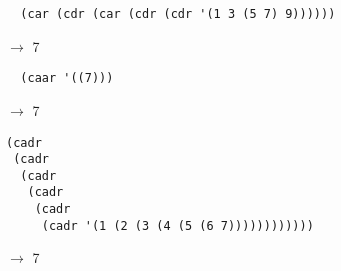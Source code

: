 \documentclass[a4paper,12pt]{article}
\begin{document}
\begin{lstlisting}
  (car (cdr (car (cdr (cdr '(1 3 (5 7) 9))))))
\end{lstlisting}
$\rightarrow$ 7
\begin{lstlisting}
  (caar '((7)))
\end{lstlisting}
$\rightarrow$ 7
\begin{lstlisting}
(cadr
 (cadr
  (cadr
   (cadr
    (cadr
     (cadr '(1 (2 (3 (4 (5 (6 7))))))))))))
\end{lstlisting}
$\rightarrow$ 7
\end{document}
